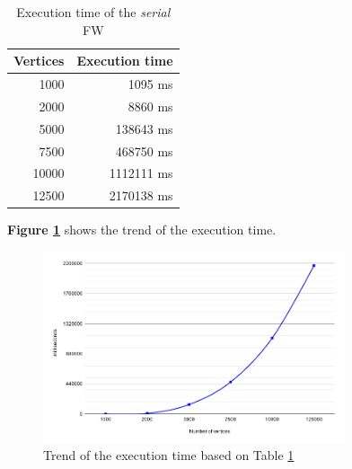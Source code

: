 \begin{table}[h!]
\centering
\begin{tabular}{|r|r|}
\hline
\rowcolor[HTML]{3166FF} 
{\color[HTML]{FFFFFF} \textbf{Vertices}} & {\color[HTML]{FFFFFF} \textbf{Execution time}} \\ \hline
1000                                     & 1095 ms                                        \\ \hline
2000                                     & 8860 ms                                        \\ \hline
5000                                     & 138643 ms                                      \\ \hline
7500                                     & 468750 ms                                      \\ \hline
10000                                    & 1112111 ms                                     \\ \hline
12500                                    & 2170138 ms                                     \\ \hline
\end{tabular}
\caption{Execution time of the \emph{serial} FW}                                                                                                                                            
\label{tab:seq-time} 
\end{table}

\textbf{Figure \ref*{fig:seq-time}} shows the trend of the execution time. 

\begin{figure}[h!]
\centering                                                                        
\includegraphics[width=3.5in]{images/seq-time}
\captionsetup{justification=centering,margin=2cm}                                                                                                                                   
\caption{Trend of the execution time based on Table \ref*{tab:seq-time}}                                                                                                                                            
\label{fig:seq-time}                                                                                                                                                           
\end{figure}


